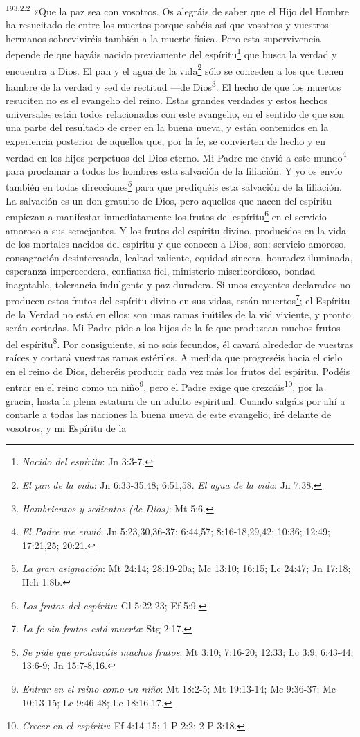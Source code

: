 \par
\textsuperscript{193:2.2} «Que la paz sea con vosotros. Os alegráis de saber que el Hijo del Hombre ha resucitado de entre los muertos porque sabéis así que vosotros y vuestros hermanos sobreviviréis también a la muerte física. Pero esta supervivencia depende de que hayáis nacido previamente del espíritu\footnote{\textit{Nacido del espíritu}: Jn 3:3-7.} que busca la verdad y encuentra a Dios. El pan y el agua de la vida\footnote{\textit{El pan de la vida}: Jn 6:33-35,48; 6:51,58. \textit{El agua de la vida}: Jn 7:38.} sólo se conceden a los que tienen hambre de la verdad y sed de rectitud ---de Dios\footnote{\textit{Hambrientos y sedientos (de Dios)}: Mt 5:6.}. El hecho de que los muertos resuciten no es el evangelio del reino. Estas grandes verdades y estos hechos universales están todos relacionados con este evangelio, en el sentido de que son una parte del resultado de creer en la buena nueva, y están contenidos en la experiencia posterior de aquellos que, por la fe, se convierten de hecho y en verdad en los hijos perpetuos del Dios eterno. Mi Padre me envió a este mundo\footnote{\textit{El Padre me envió}: Jn 5:23,30,36-37; 6:44,57; 8:16-18,29,42; 10:36; 12:49; 17:21,25; 20:21.} para proclamar a todos los hombres esta salvación de la filiación. Y yo os envío también en todas direcciones\footnote{\textit{La gran asignación}: Mt 24:14; 28:19-20a; Mc 13:10; 16:15; Lc 24:47; Jn 17:18; Hch 1:8b.} para que prediquéis esta salvación de la filiación. La salvación es un don gratuito de Dios, pero aquellos que nacen del espíritu empiezan a manifestar inmediatamente los frutos del espíritu\footnote{\textit{Los frutos del espíritu}: Gl 5:22-23; Ef 5:9.} en el servicio amoroso a sus semejantes. Y los frutos del espíritu divino, producidos en la vida de los mortales nacidos del espíritu y que conocen a Dios, son: servicio amoroso, consagración desinteresada, lealtad valiente, equidad sincera, honradez iluminada, esperanza imperecedera, confianza fiel, ministerio misericordioso, bondad inagotable, tolerancia indulgente y paz duradera. Si unos creyentes declarados no producen estos frutos del espíritu divino en sus vidas, están muertos\footnote{\textit{La fe sin frutos está muerta}: Stg 2:17.}; el Espíritu de la Verdad no está en ellos; son unas ramas inútiles de la vid viviente, y pronto serán cortadas. Mi Padre pide a los hijos de la fe que produzcan muchos frutos del espíritu\footnote{\textit{Se pide que produzcáis muchos frutos}: Mt 3:10; 7:16-20; 12:33; Lc 3:9; 6:43-44; 13:6-9; Jn 15:7-8,16.}. Por consiguiente, si no sois fecundos, él cavará alrededor de vuestras raíces y cortará vuestras ramas estériles. A medida que progreséis hacia el cielo en el reino de Dios, deberéis producir cada vez más los frutos del espíritu. Podéis entrar en el reino como un niño\footnote{\textit{Entrar en el reino como un niño}: Mt 18:2-5; Mt 19:13-14; Mc 9:36-37; Mc 10:13-15; Lc 9:46-48; Lc 18:16-17.}, pero el Padre exige que crezcáis\footnote{\textit{Crecer en el espíritu}: Ef 4:14-15; 1 P 2:2; 2 P 3:18.}, por la gracia, hasta la plena estatura de un adulto espiritual. Cuando salgáis por ahí a contarle a todas las naciones la buena nueva de este evangelio, iré delante de vosotros, y mi Espíritu de la 